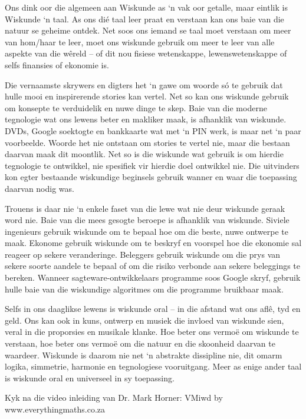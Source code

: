 { \Large
Ons dink oor die algemeen aan Wiskunde as ‘n vak oor getalle, maar eintlik is Wiskunde ‘n taal. As ons dié taal leer praat en verstaan kan ons baie van die natuur se geheime ontdek. Net soos ons iemand se taal moet verstaan om meer van hom/haar te leer, moet ons wiskunde gebruik om meer te leer van alle aspekte van die wêreld – of dit nou fisiese wetenskappe, lewenswetenskappe of selfs finansies of ekonomie is. \par

Die vernaamste skrywers en digters het ‘n gawe om woorde só te gebruik dat hulle mooi en inspirerende stories kan vertel. Net so kan ons wiskunde gebruik om konsepte te verduidelik en nuwe dinge te skep. Baie van die moderne tegnologie wat ons lewens beter en makliker maak, is afhanklik van wiskunde. DVDs, Google soektogte en bankkaarte wat met ‘n PIN werk, is maar net ‘n paar voorbeelde. Woorde het nie ontstaan om stories te vertel nie, maar die bestaan daarvan maak dit moontlik. Net so is die wiskunde wat gebruik is om hierdie tegnologie te ontwikkel, nie spesifiek vir hierdie doel ontwikkel nie. Die uitvinders kon egter bestaande wiskundige beginsels gebruik wanner en waar die toepassing daarvan nodig was. \par


Trouens is daar nie ‘n enkele faset van die lewe wat nie deur wiskunde geraak word nie. Baie van die mees gesogte beroepe is afhanklik van wiskunde. Siviele ingenieurs gebruik wiskunde om te bepaal hoe om die beste, nuwe ontwerpe te maak. Ekonome gebruik wiskunde om te beskryf en voorspel hoe die ekonomie sal reageer op sekere veranderinge. Beleggers gebruik wiskunde om die prys van sekere soorte aandele te bepaal of om die risiko verbonde aan sekere beleggings te bereken. Wanneer sagteware-ontwikkelaars programme soos Google skryf, gebruik hulle baie van die wiskundige algoritmes om die programme bruikbaar maak.\par

Selfs in ons daaglikse lewens is wiskunde oral – in die afstand wat ons aflê, tyd en geld. Ons kan ook in kuns, ontwerp en musiek die invloed van wiskunde sien, veral in die proporsies en musikale klanke. Hoe beter ons vermoë om wiskunde te verstaan, hoe beter ons vermoë om die natuur en die skoonheid daarvan te waardeer. Wiskunde is daarom nie net ‘n abstrakte dissipline nie, dit omarm logika, simmetrie, harmonie en tegnologiese vooruitgang. Meer as enige ander taal is wiskunde oral en universeel in sy toepassing. \par

Kyk na die video inleiding van Dr. Mark Horner:  VMiwd by www.everythingmaths.co.za



}





